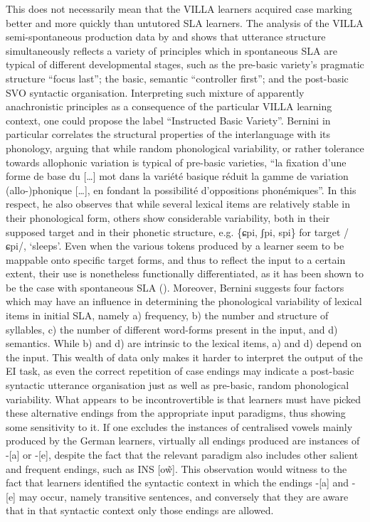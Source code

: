 This does not necessarily mean that the VILLA learners acquired case marking better and more quickly than untutored SLA learners. The analysis of the VILLA semi-spontaneous production data by \citet{Bernini2016} and \citet{Dimroth2018} shows that utterance structure simultaneously reflects a variety of principles which in spontaneous SLA are typical of different developmental stages, such as the pre-basic variety’s pragmatic structure ``focus last''; the basic, semantic ``controller first''; and the post-basic SVO syntactic organisation. Interpreting such mixture of apparently anachronistic principles as a consequence of the particular VILLA learning context, one could propose the label ``Instructed Basic Variety''. Bernini in particular correlates the structural properties of the interlanguage with its phonology, arguing that while random phonological variability, or rather tolerance towards allophonic variation is typical of pre-basic varieties, ``la fixation d’une forme de base du […] mot dans la variété basique réduit la gamme de variation (allo-)phonique […], en fondant la possibilité d’oppositions phonémiques''. In this respect, he also observes that while several lexical items are relatively stable in their phonological form, others show considerable variability, both in their supposed target and in their phonetic structure, e.g. \{ɕpi, ʃpi, spi\} for target /ɕpi/, ‘sleeps’. Even when the various tokens produced by a learner seem to be mappable onto specific target forms, and thus to reflect the input to a certain extent, their use is nonetheless functionally differentiated, as it has been shown to be the case with spontaneous SLA (\citealt{BroederEtAl1993}). Moreover, Bernini suggests four factors which may have an influence in determining the phonological variability of lexical items in initial SLA, namely a) frequency, b) the number and structure of syllables, c) the number of different word-forms present in the input, and d) semantics. While b) and d) are intrinsic to the lexical items, a) and d) depend on the input. This wealth of data only makes it harder to interpret the output of the EI task, as even the correct repetition of case endings may indicate a post-basic syntactic utterance organisation just as well as pre-basic, random phonological variability. What appears to be incontrovertible is that learners must have picked these alternative endings from the appropriate input paradigms, thus showing some sensitivity to it. If one excludes the instances of centralised vowels mainly produced by the German learners, virtually all endings produced are instances of -[a] or -[e], despite the fact that the relevant paradigm also includes other salient and frequent endings, such as INS [o\~{w}]. This observation would witness to the fact that learners identified the syntactic context in which the endings -[a] and -[e] may occur, namely transitive sentences, and conversely that they are aware that in that syntactic context only those endings are allowed.

